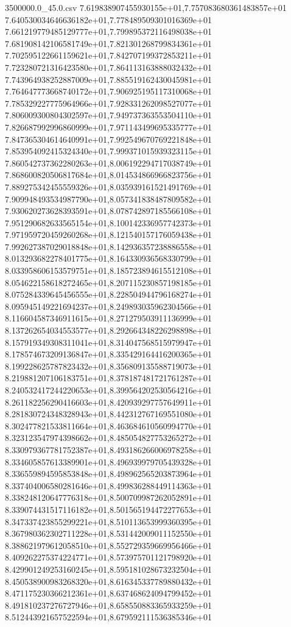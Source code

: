 \begin{filecontents*}{3500000.0_45.0.csv}
7.619838907455930155e+01,7.757083680361483857e+01
7.640530034646636182e+01,7.778489509301016369e+01
7.661219779485129777e+01,7.799895372116498038e+01
7.681908142106581749e+01,7.821301268799834361e+01
7.702595122661159621e+01,7.842707199372853211e+01
7.723280721316423580e+01,7.864113163888032432e+01
7.743964938252887009e+01,7.885519162430045981e+01
7.764647773668740172e+01,7.906925195117310068e+01
7.785329227775964966e+01,7.928331262098527077e+01
7.806009300804302597e+01,7.949737363553504110e+01
7.826687992996860999e+01,7.971143499695335777e+01
7.847365304614640991e+01,7.992549670769221848e+01
7.853954092415324340e+01,7.999371015939323115e+01
7.860542737362280263e+01,8.006192294717038749e+01
7.868600820506817684e+01,8.014534866966823756e+01
7.889275342455559326e+01,8.035939161521491769e+01
7.909948493534987790e+01,8.057341838487809582e+01
7.930620273628393591e+01,8.078742897185566108e+01
7.951290682633565154e+01,8.100142336957742373e+01
7.971959720459260268e+01,8.121540157176059438e+01
7.992627387029018848e+01,8.142936357238886558e+01
8.013293682278401775e+01,8.164330936568330799e+01
8.033958606153579751e+01,8.185723894615512108e+01
8.054622158618272465e+01,8.207115230857198185e+01
8.075284339645456555e+01,8.228504944796168274e+01
8.095945149221694237e+01,8.249893035962304566e+01
8.116604587346911615e+01,8.271279503911136999e+01
8.137262654034553577e+01,8.292664348226298898e+01
8.157919349308311041e+01,8.314047568515979947e+01
8.178574673209136847e+01,8.335429164416200365e+01
8.199228625787823432e+01,8.356809135588719073e+01
8.219881207106183751e+01,8.378187481721761287e+01
8.240532417244220653e+01,8.399564202530564216e+01
8.261182256290416603e+01,8.420939297757649911e+01
8.281830724348328943e+01,8.442312767169551080e+01
8.302477821533811664e+01,8.463684610560994770e+01
8.323123547974398662e+01,8.485054827753265272e+01
8.330979367781752387e+01,8.493186266006978258e+01
8.334605857613389901e+01,8.496939979705439328e+01
8.336559894595853848e+01,8.498962565203873964e+01
8.337404006580281646e+01,8.499836288449114363e+01
8.338248120647776318e+01,8.500709987262052891e+01
8.339074431517116182e+01,8.501565194472277653e+01
8.347337423855299221e+01,8.510113653999360395e+01
8.367980362302711228e+01,8.531442009011152550e+01
8.388621979612058510e+01,8.552729359669956466e+01
8.409262275374224771e+01,8.573975701121798920e+01
8.429901249253160245e+01,8.595181028673232504e+01
8.450538900983268320e+01,8.616345337789880432e+01
8.471175230366212361e+01,8.637468624094799452e+01
8.491810237276727946e+01,8.658550883365933259e+01
8.512443921657522594e+01,8.679592111536385346e+01

\end{filecontents*}
